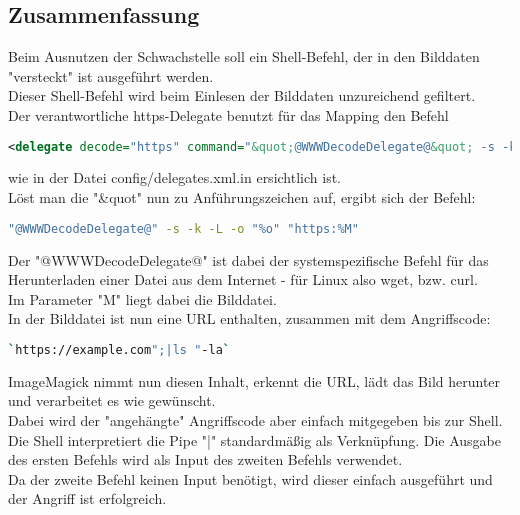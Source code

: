 \subsection{Zusammenfassung}\label{subsec:zusammenfassung}

Beim Ausnutzen der Schwachstelle soll ein Shell-Befehl, der in den Bilddaten "versteckt" ist ausgeführt werden.\\
Dieser Shell-Befehl wird beim Einlesen der Bilddaten unzureichend gefiltert.\\

Der verantwortliche https-Delegate benutzt für das Mapping den Befehl\\

\begin{lstlisting}[firstnumber=91, language=XML, caption=config/delegates.xml.in https-Delegate,label={lst:lstlisting}]
  <delegate decode="https" command="&quot;@WWWDecodeDelegate@&quot; -s -k -L -o &quot;%o&quot; &quot;https:%M&quot;"/>
\end{lstlisting}
\vspace{5mm}

wie in der Datei config/delegates.xml.in ersichtlich ist.\\

Löst man die "&quot" nun zu Anführungszeichen auf, ergibt sich der Befehl:\\
\begin{lstlisting}[firstnumber=1, language=Bash, caption=Aufgelöster https-Delegate-Befehl,label={lst:lstlisting}]
"@WWWDecodeDelegate@" -s -k -L -o "%o" "https:%M"
\end{lstlisting}
\vspace{5mm}

Der "@WWWDecodeDelegate@" ist dabei der systemspezifische Befehl für das Herunterladen einer Datei aus dem Internet - für Linux also wget, bzw. curl.\\
Im Parameter "M" liegt dabei die Bilddatei.\\

In der Bilddatei ist nun eine URL enthalten, zusammen mit dem Angriffscode:\\

\begin{lstlisting}[firstnumber=91, language=Bash, caption=Beispielhafter Inhalt einer Angriffsdatei,label={lst:lstlisting}]
`https://example.com";|ls "-la`
\end{lstlisting}
\vspace{5mm}

ImageMagick nimmt nun diesen Inhalt, erkennt die URL, lädt das Bild herunter und verarbeitet es wie gewünscht.\\

Dabei wird der "angehängte" Angriffscode aber einfach mitgegeben bis zur Shell.\\
Die Shell interpretiert die Pipe "|" standardmäßig als Verknüpfung. Die Ausgabe des ersten Befehls wird als Input des zweiten Befehls verwendet.\\
Da der zweite Befehl keinen Input benötigt, wird dieser einfach ausgeführt und der Angriff ist erfolgreich.\\

